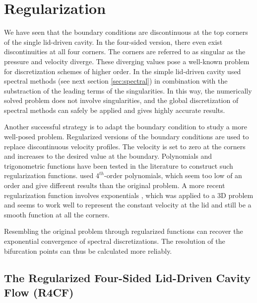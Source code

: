 
\section{Regularization} \label{sec:regul}

We have seen that the boundary conditions are discontinuous at the top corners
of the single lid-driven cavity. In the four-sided version, there even exist
discontinuities at all four corners. The corners are referred to as singular as
the pressure and velocity diverge. These diverging values pose a well-known
problem for discretization schemes of higher order. In the simple lid-driven
cavity \citet{botella1998} used spectral methods (see next section
\ref{sec:spectral}) in combination with the substraction of the leading terms
of the singularities. In this way, the numerically solved problem does not
involve singularities, and the global discretization of spectral methods can
safely be applied and gives highly accurate results. 

Another successful strategy is to adapt the boundary condition to study a more
well-posed problem. Regularized versions of the boundary conditions are used to
replace discontinuous velocity profiles. The velocity is set to zero at the
corners and increases to the desired value at the boundary. Polynomials
\citep{shen1991} and trigonometric functions have been tested in the literature
to construct such regularization functions. \cite{shen1991} used $4^{th}$-order
polynomials, which seem too low of an order and give different results than the
original problem. A more recent regularization function involves exponentials
\citep{lopez2017}, which was applied to a 3D problem and seems to work well to
represent the constant velocity at the lid and still be a smooth function at
all the corners.

Resembling the original problem through regularized functions can recover the
exponential convergence of spectral discretizations. The resolution of the
bifurcation points can thus be calculated more reliably.  

\subsection{The Regularized Four-Sided Lid-Driven Cavity Flow (R4CF)} \label{sec:r4sc}

